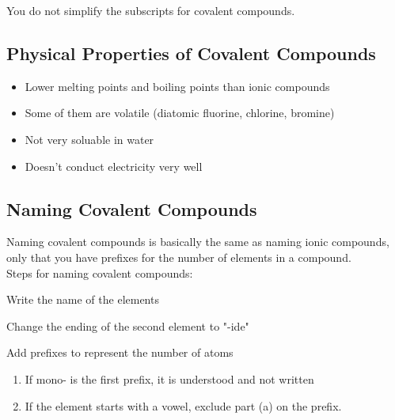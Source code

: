\documentclass[12pt]{report}
\begin{document}
\begin{note}{ }
    You do not simplify the subscripts for covalent compounds. 
\end{note}

\subsection{Physical Properties of Covalent Compounds}
\begin{itemize}
    \item{Lower melting points and boiling points than ionic compounds}
    \item{Some of them are volatile (diatomic fluorine, chlorine, bromine)}
    \item{Not very soluable in water}
    \item{Doesn't conduct electricity very well}
\end{itemize}

\subsection{Naming Covalent Compounds}
Naming covalent compounds is basically the same as naming ionic compounds, only that you have prefixes for the number of elements in a compound.\\ 

Steps for naming covalent compounds:
\begin{list0.5}
    \item{Write the name of the elements}
    \item{Change the ending of the second element to "-ide"}
    \item{Add prefixes to represent the number of atoms}
    \begin{enumerate}[label=(\alph*)]
        \item{If mono- is the first prefix, it is understood and not written}
        \item{If the element starts with a vowel, exclude part (a) on the prefix.}
    \end{enumerate}
\end{list0.5}
\end{document}
